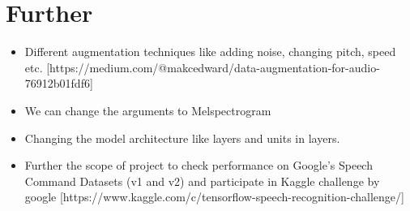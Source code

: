 \documentclass[11pt,english]{article}
\begin{document}
\section{Further}
\begin{itemize}
    \item Different augmentation techniques like adding noise, changing pitch, speed etc.
[https://medium.com/@makcedward/data-augmentation-for-audio-76912b01fdf6]
    \item We can change the arguments to Melspectrogram 
    \item Changing the model architecture like layers and units in layers.
    \item Further the scope of project to check performance on Google’s Speech Command Datasets (v1 and v2) and participate in Kaggle challenge by google
[https://www.kaggle.com/c/tensorflow-speech-recognition-challenge/]

\end{itemize}
\end{document}
